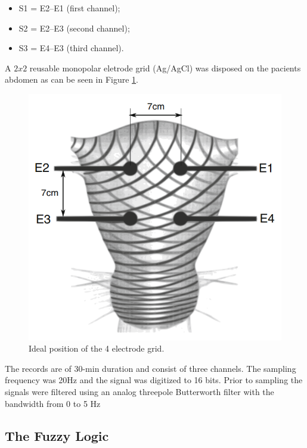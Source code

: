 \documentclass[bioengineering,article,submit,moreauthors,pdftex,10pt,a4paper]{mdpi}
\begin{document}
\begin{itemize}[leftmargin=*,labelsep=5.8mm]
	\item S1 = E2–E1 (first channel);
	\item S2 = E2–E3 (second channel);
	\item S3 = E4–E3 (third channel).
\end{itemize}

A $2x2$ reusable monopolar eletrode grid (Ag/AgCl) was disposed on the pacients abdomen as can be seen in Figure \ref{abd_elec4x4}. 

 \begin{figure}[H]
 	\caption{\label{abd_elec4x4} Ideal position of the 4 electrode grid. }
 	\begin{center}
 		\includegraphics[scale=0.43]{imagens/abd_elec4x4.png} 		
 	\end{center}
 \end{figure}
 
 The records are of 30-min
 duration and consist of three channels. The sampling frequency was 20Hz and the signal was digitized to 16 bits. Prior to
 sampling the signals were filtered using an analog threepole Butterworth filter with the bandwidth from 0 to 5 Hz \cite{ref-baseboa}
 
 \subsection{The Fuzzy Logic}
 
\end{document}
